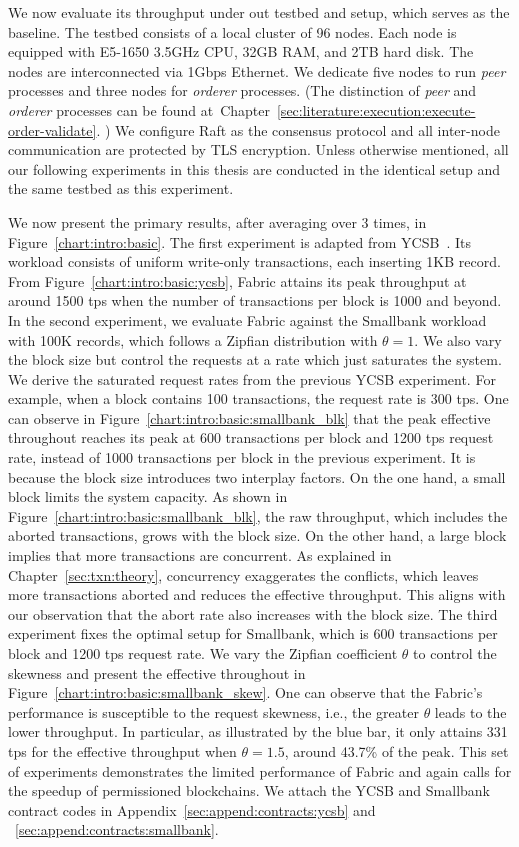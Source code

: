 We now evaluate its throughput under out testbed and setup, which serves as the baseline. 
The testbed consists of a local cluster of 96 nodes. Each node is equipped with E5-1650 3.5GHz CPU, 32GB RAM, and 2TB hard disk. The nodes are interconnected via 1Gbps Ethernet. 
We dedicate five nodes to run \textit{peer} processes and three nodes for \textit{orderer} processes. 
(The distinction of \textit{peer} and \textit{orderer} processes can be found at~Chapter~\ref{sec:literature:execution:execute-order-validate}.  )
We configure Raft as the consensus protocol and all inter-node communication are protected by TLS encryption. 
Unless otherwise mentioned, all our following experiments in this thesis are conducted in the identical setup and the same testbed as this experiment.

We now present the primary results, after averaging over 3 times, in Figure~\ref{chart:intro:basic}. 
The first experiment is adapted from YCSB~\cite{cooper2010benchmarking}. 
Its workload consists of uniform write-only transactions, each inserting 1KB record. 
From Figure~\ref{chart:intro:basic:ycsb}, Fabric attains its peak throughput at around 1500 tps when the number of transactions per block is 1000 and beyond. 
In the second experiment, we evaluate Fabric against the Smallbank workload with 100K records, which follows a Zipfian distribution with $\theta=1$. 
We also vary the block size but control the requests at a rate which just saturates the system. 
We derive the saturated request rates from the previous YCSB experiment. 
For example, when a block contains 100 transactions, the request rate is 300 tps.
One can observe in Figure~\ref{chart:intro:basic:smallbank_blk} that the peak effective throughout reaches its peak at 600 transactions per block and 1200 tps request rate, instead of 1000 transactions per block in the previous experiment. 
It is because the block size introduces two interplay factors. 
On the one hand, a small block limits the system capacity.
As shown in Figure~\ref{chart:intro:basic:smallbank_blk}, the raw throughput, which includes the aborted transactions, grows with the block size. 
On the other hand, a large block implies that more transactions are concurrent. 
As explained in Chapter~\ref{sec:txn:theory}, concurrency exaggerates the conflicts, which leaves more transactions aborted and reduces the effective throughput. 
This aligns with our observation that the abort rate also increases with the block size.
The third experiment fixes the optimal setup for Smallbank, which is 600 transactions per block and 1200 tps request rate. 
We vary the Zipfian coefficient $\theta$ to control the skewness and present the effective throughout in Figure~\ref{chart:intro:basic:smallbank_skew}. 
One can observe that the Fabric's performance is susceptible to the request skewness, i.e., the greater $\theta$ leads to the lower throughput. 
In particular, as illustrated by the blue bar, it only attains 331 tps for the effective throughput when $\theta=1.5$, around 43.7\% of the peak. 
This set of experiments demonstrates the limited performance of Fabric and again calls for the speedup of permissioned blockchains. 
We attach the YCSB and Smallbank contract codes in Appendix~\ref{sec:append:contracts:ycsb} and ~\ref{sec:append:contracts:smallbank}. 

